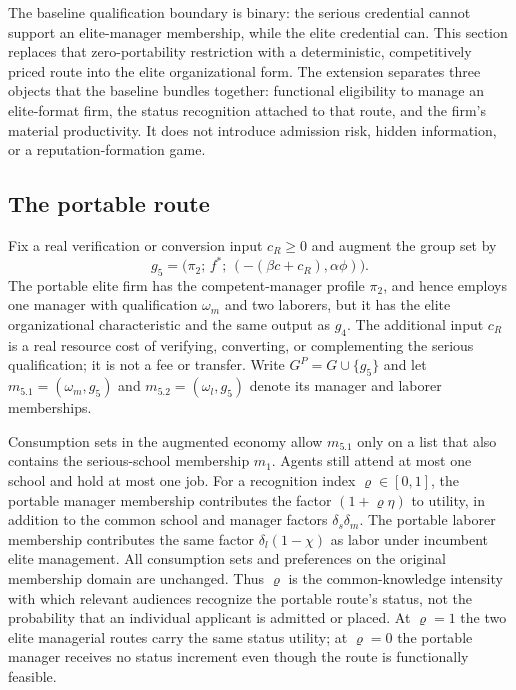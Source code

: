 \documentclass[12pt,letterpaper]{article}
\theoremstyle{definition}
\begin{document}
The baseline qualification boundary is binary: the serious credential cannot support an
elite-manager membership, while the elite credential can.
This section replaces that zero-portability restriction with a deterministic, competitively
priced route into the elite organizational form.
The extension separates three objects that the baseline bundles together:
functional eligibility to manage an elite-format firm, the status recognition attached to
that route, and the firm's material productivity.
It does not introduce admission risk, hidden information, or a reputation-formation game.

\subsection{The portable route}

Fix a real verification or conversion input $c_R\geq 0$ and augment the group set by
\begin{equation}\label{eq:portable-type}
  g_5
  =
  \big(\pi_2;\,f^\ast;\,(-(\beta c+c_R),\alpha\phi)\big).
\end{equation}
The portable elite firm has the competent-manager profile $\pi_2$, and hence employs one
manager with qualification $\omega_m$ and two laborers, but it has the elite organizational
characteristic and the same output as $g_4$.
The additional input $c_R$ is a real resource cost of verifying, converting, or
complementing the serious qualification; it is not a fee or transfer.
Write $G^P=G\cup\{g_5\}$ and let
$m_{5.1}=(\omega_m,g_5)$ and $m_{5.2}=(\omega_l,g_5)$ denote its manager and laborer
memberships.

Consumption sets in the augmented economy allow $m_{5.1}$ only on a list that also
contains the serious-school membership $m_1$.
Agents still attend at most one school and hold at most one job.
For a recognition index $\varrho\in[0,1]$, the portable manager membership contributes
the factor $(1+\varrho\eta)$ to utility, in addition to the common school and manager
factors $\delta_s\delta_m$.
The portable laborer membership contributes the same factor
$\delta_l(1-\chi)$ as labor under incumbent elite management.
All consumption sets and preferences on the original membership domain are unchanged.
Thus $\varrho$ is the common-knowledge intensity with which relevant audiences recognize
the portable route's status, not the probability that an individual applicant is admitted
or placed.
At $\varrho=1$ the two elite managerial routes carry the same status utility; at
$\varrho=0$ the portable manager receives no status increment even though the route is
functionally feasible.
\end{document}
